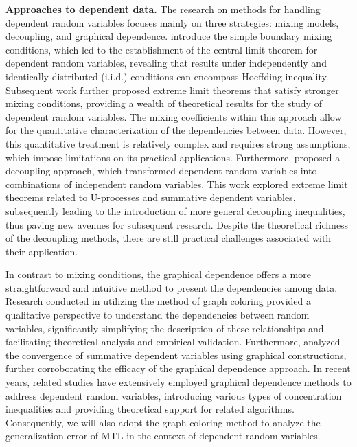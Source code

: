 \documentclass{article}
\begin{document}
\textbf{Approaches to dependent data.} The research on methods for handling dependent random variables focuses mainly on three strategies: mixing models, decoupling, and graphical dependence. \cite{rosenblatt56} introduce the simple boundary mixing conditions, which led to the establishment of the central limit theorem for dependent random variables, revealing that results under independently and identically distributed (i.i.d.) conditions can encompass Hoeffding inequality. Subsequent work \cite{volkonskii59,lbragimov62,kontrovich07,strinwart09} further proposed extreme limit theorems that satisfy stronger mixing conditions, providing a wealth of theoretical results for the study of dependent random variables. The mixing coefficients within this approach allow for the quantitative characterization of the dependencies between data. However, this quantitative treatment is relatively complex and requires strong assumptions, which impose limitations on its practical applications. Furthermore, \cite{de1999decoupling} proposed a decoupling approach, which transformed dependent random variables into combinations of independent random variables. This work explored extreme limit theorems related to U-processes and summative dependent variables, subsequently leading to the introduction of more general decoupling inequalities, thus paving new avenues for subsequent research. Despite the theoretical richness of the decoupling methods, there are still practical challenges associated with their application.

In contrast to mixing conditions, the graphical dependence offers a more straightforward and intuitive method to present the dependencies among data. Research conducted in \cite{jason04} utilizing the method of graph coloring provided a qualitative perspective to understand the dependencies between random variables, significantly simplifying the description of these relationships and facilitating theoretical analysis and empirical validation. Furthermore, \cite{janson88} analyzed the convergence of summative dependent variables using graphical constructions, further corroborating the efficacy of the graphical dependence approach. In recent years, related studies \cite{jason04,usunier2005generalization,ralaivola2015entropy,wu2023macro-auc} have extensively employed graphical dependence methods to address dependent random variables, introducing various types of concentration inequalities and providing theoretical support for related algorithms. Consequently, we will also adopt the graph coloring method to analyze the generalization error of MTL in the context of dependent random variables.
\end{document}
